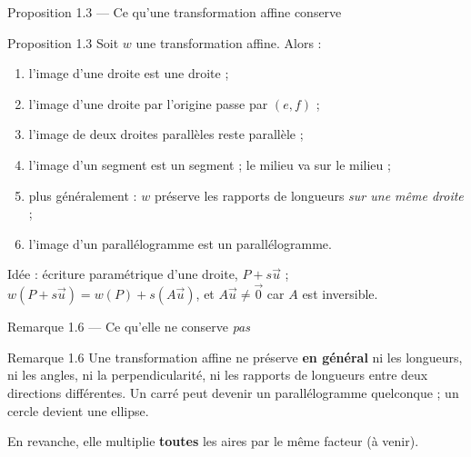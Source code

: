 \begin{frame}{Proposition 1.3 --- Ce qu'une transformation affine conserve}
  \begin{Enonce}{Proposition 1.3}
    \footnotesize Soit $w$ une transformation affine. Alors :
    \begin{enumerate}
      \item l'image d'une droite est une droite ;
      \item l'image d'une droite par l'origine passe par $(e,f)$ ;
      \item l'image de deux droites parallèles reste parallèle ;
      \item l'image d'un segment est un segment ; le milieu va sur le milieu ;
      \item plus généralement : $w$ préserve les rapports de longueurs
        \emph{sur une même droite} ;
      \item l'image d'un parallélogramme est un parallélogramme.
    \end{enumerate}
  \end{Enonce}
  \begin{AuTableau}
    \footnotesize Idée : écriture paramétrique d'une droite,
    $P + s\vec u$ ; $w(P+s\vec u) = w(P) + s(A\vec u)$, et $A\vec u \neq
    \vec 0$ car $A$ est inversible.
  \end{AuTableau}
\end{frame}

\begin{frame}{Remarque 1.6 --- Ce qu'elle ne conserve \emph{pas}}
  \begin{Rem}{Remarque 1.6}
    Une transformation affine ne préserve \textbf{en général} ni les
    longueurs, ni les angles, ni la perpendicularité, ni les rapports
    de longueurs entre deux directions différentes. Un carré peut
    devenir un parallélogramme quelconque ; un cercle devient une
    ellipse.
    \vspace{4pt}

    En revanche, elle multiplie \textbf{toutes} les aires par le même
    facteur (à venir).
  \end{Rem}
\end{frame}

